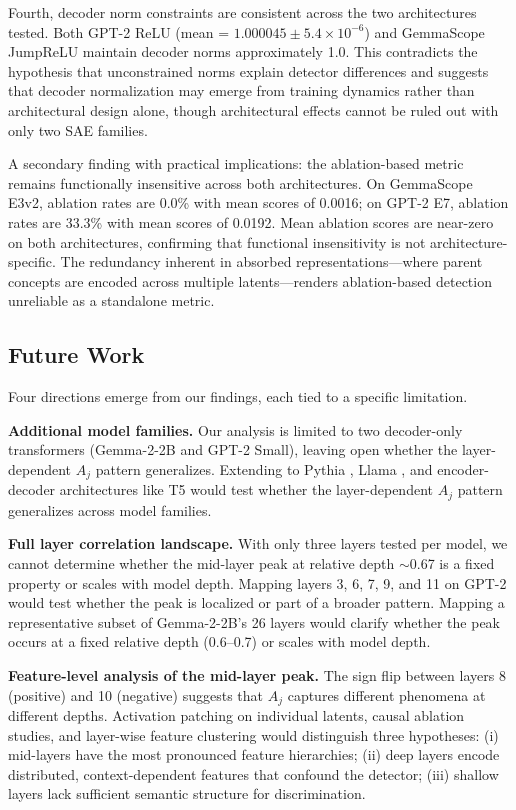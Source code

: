 \documentclass{article}
\begin{document}
Fourth, decoder norm constraints are consistent across the two architectures tested. Both GPT-2 ReLU (mean = $1.000045 \pm 5.4 \times 10^{-6}$) and GemmaScope JumpReLU maintain decoder norms approximately 1.0. This contradicts the hypothesis that unconstrained norms explain detector differences and suggests that decoder normalization may emerge from training dynamics rather than architectural design alone, though architectural effects cannot be ruled out with only two SAE families.

A secondary finding with practical implications: the ablation-based metric remains functionally insensitive across both architectures. On GemmaScope E3v2, ablation rates are 0.0\% with mean scores of 0.0016; on GPT-2 E7, ablation rates are 33.3\% with mean scores of 0.0192. Mean ablation scores are near-zero on both architectures, confirming that functional insensitivity is not architecture-specific. The redundancy inherent in absorbed representations---where parent concepts are encoded across multiple latents---renders ablation-based detection unreliable as a standalone metric.

\subsection{Future Work}
\label{sec:future}

Four directions emerge from our findings, each tied to a specific limitation.

\textbf{Additional model families.} Our analysis is limited to two decoder-only transformers (Gemma-2-2B and GPT-2 Small), leaving open whether the layer-dependent $A_j$ pattern generalizes. Extending to Pythia \citep{biderman2023pythia}, Llama \citep{touvron2023llama}, and encoder-decoder architectures like T5 would test whether the layer-dependent $A_j$ pattern generalizes across model families.

\textbf{Full layer correlation landscape.} With only three layers tested per model, we cannot determine whether the mid-layer peak at relative depth $\sim$0.67 is a fixed property or scales with model depth. Mapping layers 3, 6, 7, 9, and 11 on GPT-2 would test whether the peak is localized or part of a broader pattern. Mapping a representative subset of Gemma-2-2B's 26 layers would clarify whether the peak occurs at a fixed relative depth (0.6--0.7) or scales with model depth.

\textbf{Feature-level analysis of the mid-layer peak.} The sign flip between layers 8 (positive) and 10 (negative) suggests that $A_j$ captures different phenomena at different depths. Activation patching on individual latents, causal ablation studies, and layer-wise feature clustering would distinguish three hypotheses: (i) mid-layers have the most pronounced feature hierarchies; (ii) deep layers encode distributed, context-dependent features that confound the detector; (iii) shallow layers lack sufficient semantic structure for discrimination.
\end{document}
